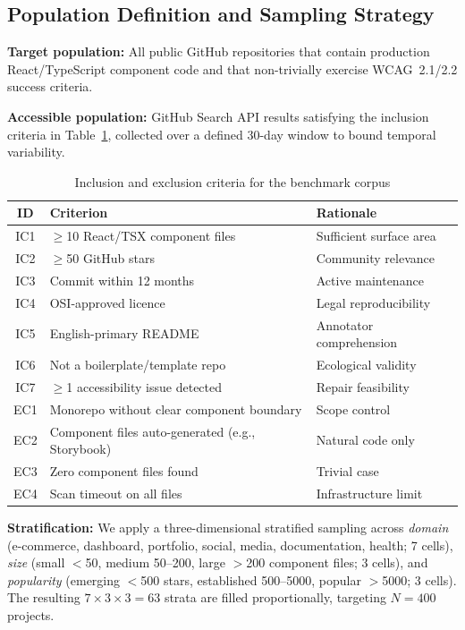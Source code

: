 \documentclass[10pt,conference]{IEEEtran}
\begin{document}
\subsection{Population Definition and Sampling Strategy}

\textbf{Target population:} All public GitHub repositories that contain
production React/TypeScript component code and that non-trivially exercise
WCAG~2.1/2.2 success criteria.

\textbf{Accessible population:} GitHub Search API results satisfying the
inclusion criteria in Table~\ref{tab:criteria}, collected over a defined
30-day window to bound temporal variability.

\begin{table}[htbp]
\caption{Inclusion and exclusion criteria for the benchmark corpus}
\label{tab:criteria}
\centering\small
\begin{tabularx}{\columnwidth}{cXl}
\toprule
\textbf{ID} & \textbf{Criterion} & \textbf{Rationale} \\
\midrule
IC1 & $\geq$10 React/TSX component files & Sufficient surface area \\
IC2 & $\geq$50 GitHub stars & Community relevance \\
IC3 & Commit within 12 months & Active maintenance \\
IC4 & OSI-approved licence & Legal reproducibility \\
IC5 & English-primary README & Annotator comprehension \\
IC6 & Not a boilerplate/template repo & Ecological validity \\
IC7 & $\geq$1 accessibility issue detected & Repair feasibility \\
\midrule
EC1 & Monorepo without clear component boundary & Scope control \\
EC2 & Component files auto-generated (e.g., Storybook) & Natural code only \\
EC3 & Zero component files found & Trivial case \\
EC4 & Scan timeout on all files & Infrastructure limit \\
\bottomrule
\end{tabularx}
\end{table}

\textbf{Stratification:} We apply a three-dimensional stratified sampling
across \emph{domain} (e-commerce, dashboard, portfolio, social, media,
documentation, health; 7 cells), \emph{size} (small $<$50, medium 50--200,
large $>$200 component files; 3 cells), and \emph{popularity} (emerging
$<$500 stars, established 500--5000, popular $>$5000; 3 cells).  The
resulting $7 \times 3 \times 3 = 63$ strata are filled proportionally,
targeting $N = 400$ projects.
\end{document}
